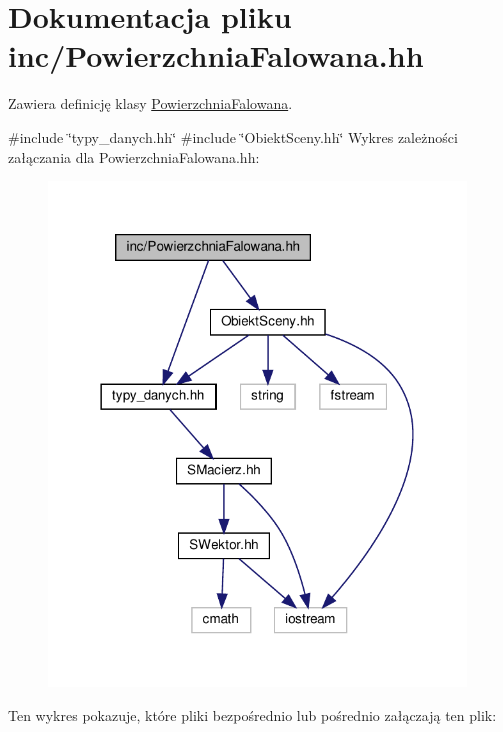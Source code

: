 \hypertarget{PowierzchniaFalowana_8hh}{}\section{Dokumentacja pliku inc/\+Powierzchnia\+Falowana.hh}
\label{PowierzchniaFalowana_8hh}


Zawiera definicję klasy \hyperlink{classPowierzchniaFalowana}{Powierzchnia\+Falowana}.  


{\ttfamily \#include \char`\"{}typy\+\_\+danych.\+hh\char`\"{}}\newline
{\ttfamily \#include \char`\"{}Obiekt\+Sceny.\+hh\char`\"{}}\newline
Wykres zależności załączania dla Powierzchnia\+Falowana.\+hh\+:\nopagebreak
\begin{figure}[H]
\begin{center}
\leavevmode
\includegraphics[width=314pt]{PowierzchniaFalowana_8hh__incl}
\end{center}
\end{figure}
Ten wykres pokazuje, które pliki bezpośrednio lub pośrednio załączają ten plik\+:\nopagebreak
